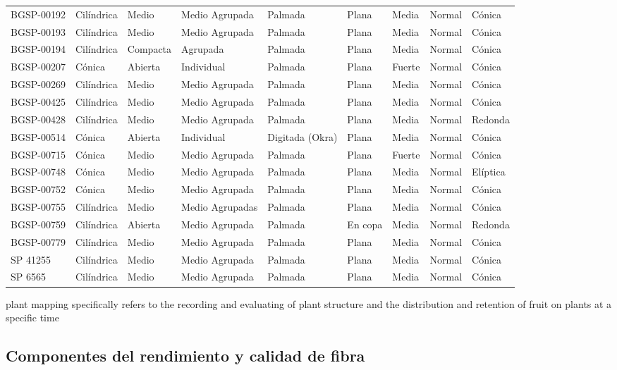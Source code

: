 \documentclass[12pt,oneside]{reedthesis}
\begin{document}
\begin{table}[!h]
{\begin{tabular}[t]{lllllllll}
\addlinespace
BGSP-00192 & Cilíndrica & Medio & Medio Agrupada & Palmada & Plana & Media & Normal & Cónica\\
BGSP-00193 & Cilíndrica & Medio & Medio Agrupada & Palmada & Plana & Media & Normal & Cónica\\
BGSP-00194 & Cilíndrica & Compacta & Agrupada & Palmada & Plana & Media & Normal & Cónica\\
BGSP-00207 & Cónica & Abierta & Individual & Palmada & Plana & Fuerte & Normal & Cónica\\
BGSP-00269 & Cilíndrica & Medio & Medio Agrupada & Palmada & Plana & Media & Normal & Cónica\\
\addlinespace
BGSP-00425 & Cilíndrica & Medio & Medio Agrupada & Palmada & Plana & Media & Normal & Cónica\\
BGSP-00428 & Cilíndrica & Medio & Medio Agrupada & Palmada & Plana & Media & Normal & Redonda\\
BGSP-00514 & Cónica & Abierta & Individual & Digitada (Okra) & Plana & Media & Normal & Cónica\\
BGSP-00715 & Cónica & Medio & Medio Agrupada & Palmada & Plana & Fuerte & Normal & Cónica\\
BGSP-00748 & Cónica & Medio & Medio Agrupada & Palmada & Plana & Media & Normal & Elíptica\\
\addlinespace
BGSP-00752 & Cónica & Medio & Medio Agrupada & Palmada & Plana & Media & Normal & Cónica\\
BGSP-00755 & Cilíndrica & Medio & Medio Agrupadas & Palmada & Plana & Media & Normal & Cónica\\
BGSP-00759 & Cilíndrica & Abierta & Medio Agrupada & Palmada & En copa & Media & Normal & Redonda\\
BGSP-00779 & Cilíndrica & Medio & Medio Agrupada & Palmada & Plana & Media & Normal & Cónica\\
SP 41255 & Cilíndrica & Medio & Medio Agrupada & Palmada & Plana & Media & Normal & Cónica\\
\addlinespace
SP 6565 & Cilíndrica & Medio & Medio Agrupada & Palmada & Plana & Media & Normal & Cónica\\
\bottomrule
\end{tabular}}
\end{table}

plant mapping specifically refers to the recording and evaluating of plant structure and the distribution and retention of fruit on plants at a specific time \autocite{kerby2010}

\subsection{Componentes del rendimiento y calidad de fibra}\label{componentes-del-rendimiento-y-calidad-de-fibra}
\end{document}
